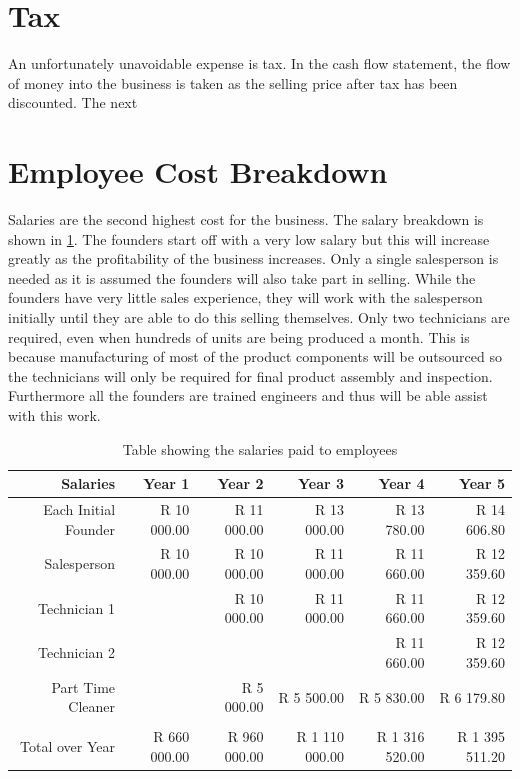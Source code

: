\section{Tax}

An unfortunately unavoidable  expense is tax. In the cash flow statement, the flow of money into the business is taken as the selling price after tax has been discounted. The next  


\section{Employee Cost Breakdown}

Salaries are the second highest cost for the business. The salary breakdown is shown in \cref{tab:salaries}. The founders start off with a very low salary but this will increase greatly as the profitability of the business increases. Only a single salesperson is needed as it is assumed the founders will also take part in selling. While the founders have very little sales experience, they will work with the salesperson initially until they are able to do this selling themselves. Only two technicians are required, even when hundreds of units are being produced a month. This is because manufacturing of most of the product components will be outsourced so the technicians will only be required for final product assembly and inspection. Furthermore all the founders are trained engineers and thus will be able assist with this work.


\begin{table}[htbp]
  \centering
  \caption{Table showing the salaries paid to employees}
    \begin{tabular}{rrrrrr}
    \toprule
    Salaries & Year 1 & Year 2 & Year 3 & Year 4 & Year 5 \\
    \midrule
    Each Initial Founder & R 10 000.00 & R 11 000.00 & R 13 000.00 & R 13 780.00 & R 14 606.80 \\
    Salesperson & R 10 000.00 & R 10 000.00 & R 11 000.00 & R 11 660.00 & R 12 359.60 \\
    Technician 1 &       & R 10 000.00 & R 11 000.00 & R 11 660.00 & R 12 359.60 \\
    Technician 2 &       &       &       & R 11 660.00 & R 12 359.60 \\
    Part Time Cleaner &       & R 5 000.00 & R 5 500.00 & R 5 830.00 & R 6 179.80 \\
          &       &       &       &       &  \\
    Total over Year & R 660 000.00 & R 960 000.00 & R 1 110 000.00 & R 1 316 520.00 & R 1 395 511.20 \\
    \bottomrule
    \end{tabular}%
  \label{tab:salaries}%
\end{table}%

